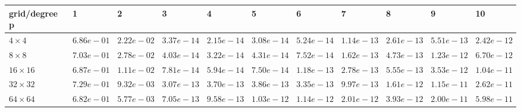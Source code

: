 \begin{tabular}{lllllllllll}
\hline
 grid/degree p   & 1          & 2          & 3          & 4          & 5          & 6          & 7          & 8          & 9          & 10         \\
\hline
 $4 \times 4$    & $6.86e-01$ & $2.22e-02$ & $3.37e-14$ & $2.15e-14$ & $3.08e-14$ & $5.24e-14$ & $1.14e-13$ & $2.61e-13$ & $5.51e-13$ & $2.42e-12$ \\
 $8 \times 8$    & $7.03e-01$ & $2.78e-02$ & $4.03e-14$ & $3.22e-14$ & $4.31e-14$ & $7.52e-14$ & $1.62e-13$ & $4.73e-13$ & $1.23e-12$ & $6.70e-12$ \\
 $16 \times 16$  & $6.87e-01$ & $1.11e-02$ & $7.81e-14$ & $5.94e-14$ & $7.50e-14$ & $1.18e-13$ & $2.78e-13$ & $5.55e-13$ & $3.53e-12$ & $1.04e-11$ \\
 $32 \times 32$  & $7.29e-01$ & $9.32e-03$ & $3.07e-13$ & $3.70e-13$ & $3.86e-13$ & $3.35e-13$ & $9.97e-13$ & $1.61e-12$ & $1.15e-11$ & $2.62e-11$ \\
 $64 \times 64$  & $6.82e-01$ & $5.77e-03$ & $7.05e-13$ & $9.58e-13$ & $1.03e-12$ & $1.14e-12$ & $2.01e-12$ & $3.93e-12$ & $2.00e-11$ & $5.98e-11$ \\
\hline
\end{tabular}